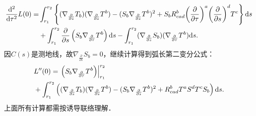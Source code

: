 \begin{align*}
    \frac{{\rm d}^2}{{\rm d} \tau^2 }L(0)
    =&  \int_{r_1}^{r_2}\left\{ (\nabla_{\frac{\partial}{\partial s}} {T}_b)
      (\nabla_{\frac{\partial}{\partial s}} {T}^b)
      -({S}_b \nabla_{\frac{\partial}{\partial s}} {T}^b)^2
    + {S}_b  R_{cad}^b {\left(\frac{\partial}{\partial \tau}\right)^a}
       {\left(\frac{\partial}{\partial s}\right)^d}{{T}^c}  \right\} {\rm d}s  \\
    & + \int_{r_1}^{r_2}  \frac{\partial}{\partial s} \left( {S}_b
        \nabla_{\frac{\partial}{\partial \tau}} {T}^b    \right) {\rm d}s
      - \int_{r_1}^{r_2} (\nabla_{\frac{\partial}{\partial s}} {S}_b) (
        \nabla_{\frac{\partial}{\partial \tau}} {T}^b) {\rm d}s .
\end{align*}\setlength{\mathindent}{2em}
因$C(s)$是测地线，故$\nabla_{\frac{\partial}{\partial s}} {S}_b=0$，继续计算得到{\heiti 弧长第二变分公式}：
\begin{equation}\label{chgd:eqn_2st-var-arc}
    \begin{aligned}
    &L''(0)= \left.\left( {S}_b  \nabla_{\frac{\partial}{\partial \tau}} {T}^b \right)\right|_{r_1}^{r_2} \\
    & +\int_{r_1}^{r_2} \left( (\nabla_{\frac{\partial}{\partial s}} {T}_b)
       (\nabla_{\frac{\partial}{\partial s}} {T}^b)
       -({S}_b \nabla_{\frac{\partial}{\partial s}} {T}^b)^2
     +  R_{cad}^b {T^a} {S^d}T{^c}{S}_b \right) {\rm d}s .
    \end{aligned}
\end{equation}
上面所有计算都需按诱导联络理解． 


